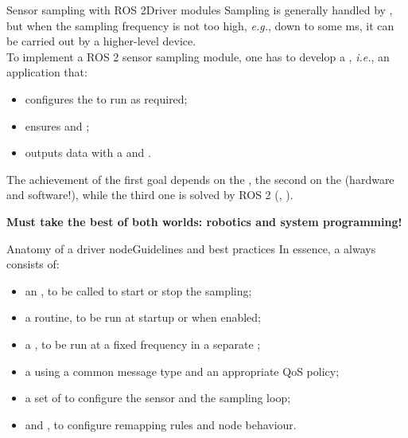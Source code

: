 \begin{frame}{Sensor sampling with ROS 2}{Driver modules}
	Sampling is generally handled by , but when the sampling frequency is not too high, \emph{e.g.}, down to some ms, it can be carried out by a higher-level device.\\
	To implement a ROS 2 sensor sampling module, one has to develop a , \emph{i.e.}, an application that:
	\begin{itemize}
		\item configures the  to run as required;
		\item ensures  and ;
		\item outputs data with a  and .
	\end{itemize}
  The achievement of the first goal depends on the , the second on the  (hardware and software!), while the third one is solved by ROS 2 (, ).
	\begin{block}{}
		\centering
		\textbf{Must take the best of both worlds: robotics and system programming!}
	\end{block}
\end{frame}

\begin{frame}{Anatomy of a driver node}{Guidelines and best practices}
  In essence, a  always consists of:
  \begin{itemize}
    \item an , to be called to start or stop the sampling;
    \item a  routine, to be run at startup or when enabled;
    \item a , to be run at a fixed frequency in a separate ;
    \item a  using a common message type and an appropriate QoS policy;
    \item a set of  to configure the sensor and the sampling loop;
    \item {} and , to configure remapping rules and node behaviour.
  \end{itemize}
\end{frame}
